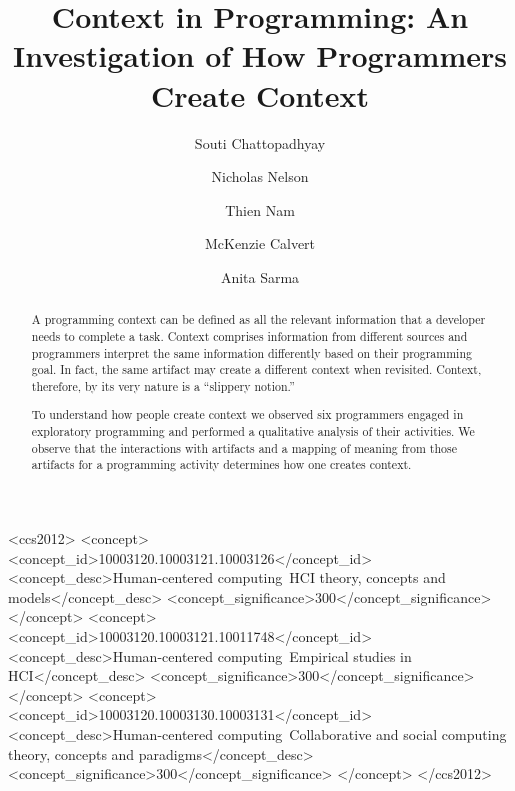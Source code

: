 \documentclass[sigconf]{acmart}
\begin{document}
\title{Context in Programming: An Investigation of How Programmers Create Context}

\author{Souti Chattopadhyay}

\author{Nicholas Nelson}

\author{Thien Nam}

\author{McKenzie Calvert}

\author{Anita Sarma}

\renewcommand{\shortauthors}{S. Chattopadhyay et al.}


\begin{abstract}
A programming context can be defined as all the relevant information that a developer needs to complete a task. Context comprises information from different sources and programmers interpret the same information differently based on their programming goal. In fact, the same artifact may create a different context when revisited. Context, therefore, by its very nature is a ``slippery notion.''

To understand how people create context we observed six programmers engaged in exploratory programming and performed a qualitative analysis of their activities. We observe that the interactions with artifacts and a mapping of meaning from those artifacts for a programming activity determines how one creates context.
\end{abstract}

%
%
\begin{CCSXML}
<ccs2012>
<concept>
<concept_id>10003120.10003121.10003126</concept_id>
<concept_desc>Human-centered computing~HCI theory, concepts and models</concept_desc>
<concept_significance>300</concept_significance>
</concept>
<concept>
<concept_id>10003120.10003121.10011748</concept_id>
<concept_desc>Human-centered computing~Empirical studies in HCI</concept_desc>
<concept_significance>300</concept_significance>
</concept>
<concept>
<concept_id>10003120.10003130.10003131</concept_id>
<concept_desc>Human-centered computing~Collaborative and social computing theory, concepts and paradigms</concept_desc>
<concept_significance>300</concept_significance>
</concept>
</ccs2012>
\end{CCSXML}
\end{document}
